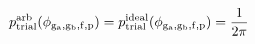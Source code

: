 \documentclass[12pt]{article}
\begin{document}
\begin{displaymath}
p_{\rm trial}^{\rm arb}(\phi_{\rm g_a,g_b,f,p}) =
p_{\rm trial}^{\rm ideal}(\phi_{\rm g_a,g_b,f,p}) = {{1}\over{2 \pi}}
\end{displaymath}
\end{document}
